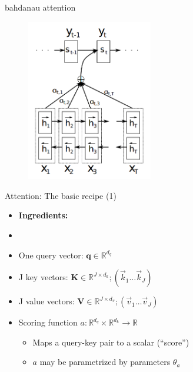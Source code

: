 \begin{frame}{bahdanau attention}
	
\vfill

\begin{figure}
	\centering
		\includegraphics[width = 5.5cm]{figure/bahdanau-attention.png}\\ 
\end{figure}

\vfill
	
\end{frame}


\begin{vbframe}{Attention: The basic recipe (1)}

\vfill

\begin{itemize}
	\item \textbf{Ingredients:}
	\item[]
	\item One query vector: $\mathbf{q} \in \mathbb{R}^{d_q}$
	\item J key vectors: $\mathbf{K} \in \mathbb{R}^{J \times d_k}; (\vec k_1 \ldots \vec k_J)$
	\item J value vectors: $\mathbf{V} \in \mathbb{R}^{J \times d_v}; (\vec v_1 \ldots \vec v_J)$
	\item Scoring function $a : \mathbb{R}^{d_q} \times \mathbb{R}^{d_k} \rightarrow \mathbb{R}$
		\begin{itemize}
			\item Maps a query-key pair to a scalar (``score'')
			\item $a$ may be parametrized by parameters $\theta_a$
		\end{itemize}
\end{itemize}

\vfill

\end{vbframe}

